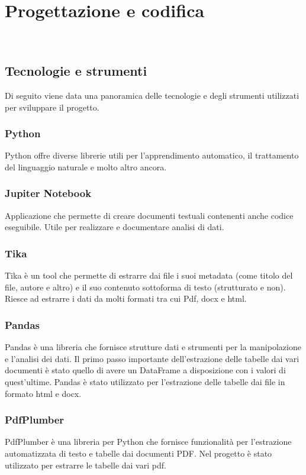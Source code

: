 \chapter{Progettazione e codifica}
\label{cap:progettazione-codifica}

\\

\section{Tecnologie e strumenti}
\label{sec:tecnologie-strumenti}

Di seguito viene data una panoramica delle tecnologie e degli strumenti utilizzati per sviluppare il progetto.
\subsection{Python}
Python offre diverse librerie utili per l'apprendimento automatico, il trattamento del linguaggio naturale e molto altro ancora.
\subsection{Jupiter Notebook}
Applicazione che permette di creare documenti testuali contenenti anche codice eseguibile. Utile per realizzare e documentare analisi di dati.
\subsection{Tika}
\label{subsec:tika}
Tika è un tool che permette di estrarre dai file i suoi metadata (come titolo del file, autore e altro) e il suo contenuto sottoforma di testo (strutturato e non).
Riesce ad estrarre i dati da molti formati tra cui Pdf, docx e html.
\subsection{Pandas}
\label{subsec:pandas}
Pandas è una libreria che fornisce strutture dati e strumenti per la manipolazione e l'analisi dei dati.
Il primo passo importante dell'estrazione delle tabelle dai vari documenti è stato quello di avere un DataFrame a disposizione con i valori di quest'ultime. 
Pandas è stato utilizzato per l'estrazione delle tabelle dai file in formato html e docx.
\subsection{PdfPlumber}
\label{subsec:pdfplumber}
PdfPlumber è una libreria per Python che fornisce funzionalità per l'estrazione automatizzata di testo e tabelle dai documenti PDF.
Nel progetto è stato utilizzato per estrarre le tabelle dai vari pdf.
